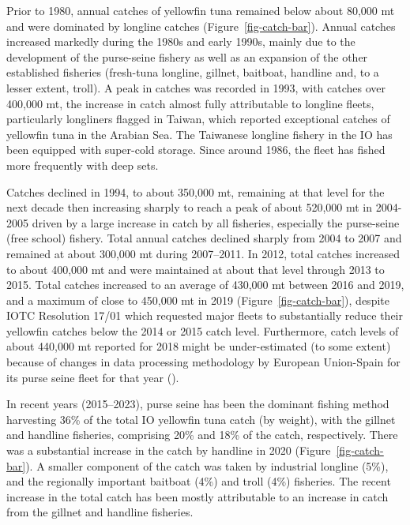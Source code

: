 \documentclass[
]{scrartcl}
\begin{document}
Prior to 1980, annual catches of yellowfin tuna remained below about
80,000 mt and were dominated by longline catches
(Figure~\ref{fig-catch-bar}). Annual catches increased markedly during
the 1980s and early 1990s, mainly due to the development of the
purse-seine fishery as well as an expansion of the other established
fisheries (fresh-tuna longline, gillnet, baitboat, handline and, to a
lesser extent, troll). A peak in catches was recorded in 1993, with
catches over 400,000 mt, the increase in catch almost fully attributable
to longline fleets, particularly longliners flagged in Taiwan, which
reported exceptional catches of yellowfin tuna in the Arabian Sea. The
Taiwanese longline fishery in the IO has been equipped with super-cold
storage. Since around 1986, the fleet has fished more frequently with
deep sets.

Catches declined in 1994, to about 350,000 mt, remaining at that level
for the next decade then increasing sharply to reach a peak of about
520,000 mt in 2004-2005 driven by a large increase in catch by all
fisheries, especially the purse-seine (free school) fishery. Total
annual catches declined sharply from 2004 to 2007 and remained at about
300,000 mt during 2007--2011. In 2012, total catches increased to about
400,000 mt and were maintained at about that level through 2013 to 2015.
Total catches increased to an average of 430,000 mt between 2016 and
2019, and a maximum of close to 450,000 mt in 2019
(Figure~\ref{fig-catch-bar}), despite IOTC Resolution 17/01 which
requested major fleets to substantially reduce their yellowfin catches
below the 2014 or 2015 catch level. Furthermore, catch levels of about
440,000 mt reported for 2018 might be under-estimated (to some extent)
because of changes in data processing methodology by European
Union-Spain for its purse seine fleet for that year
().

In recent years (2015--2023), purse seine has been the dominant fishing
method harvesting 36\% of the total IO yellowfin tuna catch (by weight),
with the gillnet and handline fisheries, comprising 20\% and 18\% of the
catch, respectively. There was a substantial increase in the catch by
handline in 2020 (Figure~\ref{fig-catch-bar}). A smaller component of
the catch was taken by industrial longline (5\%), and the regionally
important baitboat (4\%) and troll (4\%) fisheries. The recent increase
in the total catch has been mostly attributable to an increase in catch
from the gillnet and handline fisheries.
\end{document}
